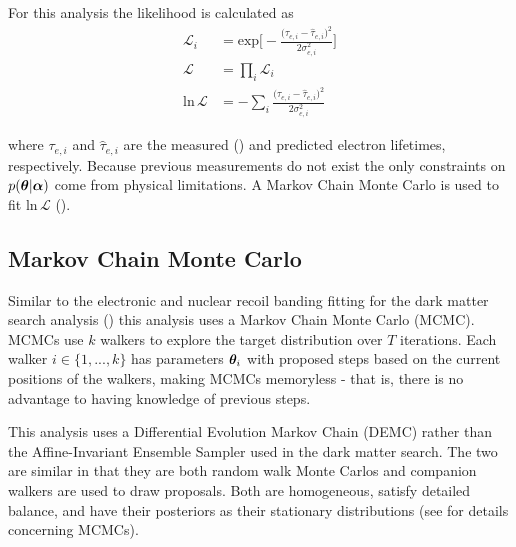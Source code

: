 For this analysis the likelihood is calculated as
\vspace{-5pt}
\begin{subequations}
\begin{align}
\mathcal{L}_i &= \mathrm{exp} \Bigg[ -\frac{\big(\tau_{e, i} -
\hat{\tau}_{e, i} \big)^2}{2 \sigma_{e, i}^2} \Bigg]
\\[3pt]
\mathcal{L} &= \prod_i \mathcal{L}_i
\\[3pt]
\mathrm{ln}\, \mathcal{L} &= -\sum_i \frac{\big(\tau_{e, i} -
\hat{\tau}_{e, i} \big)^2}{2\sigma_{e, i}^2}
\end{align}
\label{eq:elifetime_fit_mcmc_de_snooker_projs}
\end{subequations}

\vspace{-25pt}

\noindent where $\tau_{e, i}$ and $\hat{\tau}_{e, i}$ are the measured () and predicted
electron lifetimes, respectively.  Because previous measurements do not exist the only constraints on $p(\boldsymbol{\theta}|\boldsymbol{\alpha})$
come from physical limitations.  A Markov Chain Monte Carlo is used to fit $\mathrm{ln}\, \mathcal{L}$
().



\subsection{Markov Chain Monte Carlo}
\label{subsec:elifetime_fit_mcmc}
Similar to the electronic and nuclear recoil banding fitting for the dark matter search analysis
() this analysis uses a Markov Chain Monte Carlo (MCMC).  MCMCs use $k$ walkers
to explore the target distribution
over $T$ iterations.  Each walker $i \in \{1, ..., k\}$ has parameters $\boldsymbol{\theta}_i$ with proposed steps based on the current
positions of the walkers, making MCMCs memoryless - that is, there is no advantage to having knowledge of previous steps.

This analysis uses a Differential Evolution Markov Chain (DEMC) rather than the Affine-Invariant Ensemble Sampler used in the dark matter
search.  The two are similar in that they are both random walk Monte Carlos and companion walkers are used to draw proposals.  Both are
homogeneous, satisfy detailed balance, and have their posteriors as their stationary distributions (see
 for details concerning MCMCs).


